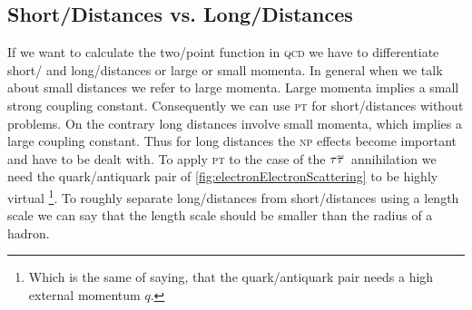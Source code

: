 \documentclass[../../index.tex]{subfiles}
\begin{document}
\subsection{Short\-/Distances vs. Long\-/Distances}
If we want to calculate the two\-/point function in \textsc{qcd} we have to
differentiate short\-/ and long\-/distances or large or small momenta. In
general when we talk about small distances we refer to large momenta. Large
momenta implies a small strong coupling constant. Consequently we can use
\textsc{pt} for short\-/distances without problems. On the contrary long
distances involve small momenta, which implies a large coupling constant. Thus
for long distances the \textsc{np} effects become important and have to be dealt
with. To apply \textsc{pt} to the case of the \(\tau\overline{\tau}\,\) annihilation
we need the quark\-/antiquark pair of \cref{fig:electronElectronScattering} to
be highly virtual \footnote{Which is the same of saying, that the
  quark\-/antiquark pair needs a high external momentum \(q\).}. To roughly
separate long\-/distances from short\-/distances using a length scale we can say
that the length scale should be smaller than the radius of a hadron.
\end{document}
